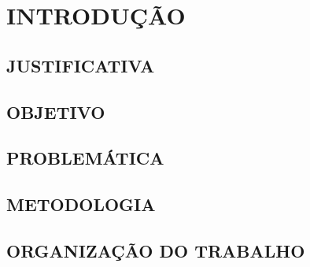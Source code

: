 \chapter{INTRODUÇÃO}
\label{chap:introducao}

\section{JUSTIFICATIVA}
\label{sec:justificativa}

\section{OBJETIVO}
\label{sec:objetivo}

\section{PROBLEMÁTICA}
\label{sec:problematica}

\section{METODOLOGIA}
\label{sec:metodologia}

\section{ORGANIZAÇÃO DO TRABALHO}
\label{sec:organizacao}

